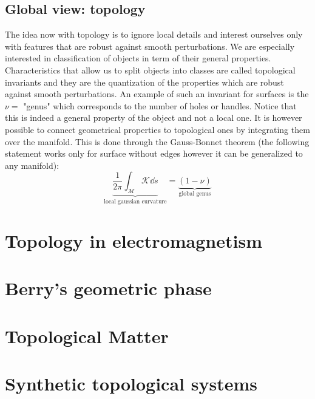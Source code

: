 \documentclass[10pt,a4paper]{book}
\begin{document}
\subsection{Global view: topology}
The idea now with topology is to ignore local details and interest ourselves only with features that are robust against smooth perturbations. We are especially interested in classification of objects in term of their general properties. Characteristics that allow us to split objects into classes are called topological invariants and they are the quantization of the properties which are robust against smooth perturbations. An example of such an invariant for surfaces is the $\nu = $ "genus" which corresponds to the number of holes or handles. Notice that this is indeed a general property of the object and not a local one. It is however possible to connect geometrical properties to topological ones by integrating them over the manifold. This is done through the Gauss-Bonnet theorem (the following statement works only for surface without edges however it can be generalized to any manifold):
\[ 
\underbrace{\frac{1}{2\pi} \int_\mathcal{M} \mathcal{K} \dd s}_{\text{local gaussian curvature}} = \underbrace{(1 - \nu)}_{\text{global genus}}
\]

\section{Topology in electromagnetism}
\section{Berry's geometric phase}
\section{Topological Matter}
\section{Synthetic topological systems}
\end{document}
